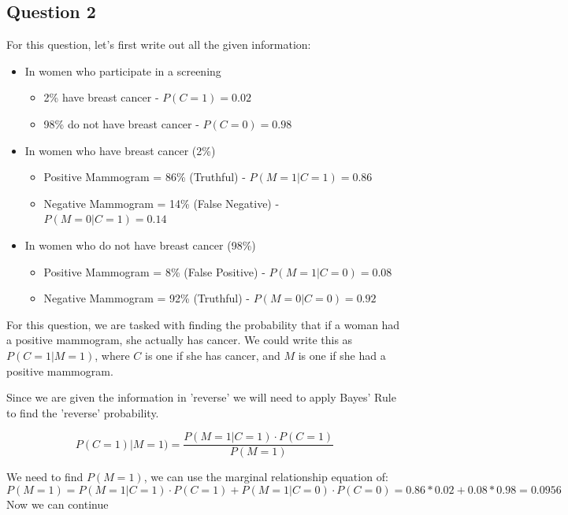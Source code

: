 \documentclass[conf]{new-aiaa}
\begin{document}
\subsection{Question 2}

For this question, let's first write out all the given information:

\begin{itemize}
    \item In women who participate in a screening
    \begin{itemize}
        \item 2\% have breast cancer - $P(C = 1) = 0.02$
        \item 98\% do not have breast cancer - $P(C = 0) = 0.98$
    \end{itemize}

    \item In women who have breast cancer (2\%)
    \begin{itemize}
        \item Positive Mammogram = 86\% (Truthful) - $P(M = 1|C = 1) = 0.86$
        \item Negative Mammogram = 14\% (False Negative) - $P(M = 0|C = 1) = 0.14$
    \end{itemize}

    \item In women who do not have breast cancer (98\%)
    \begin{itemize}
        \item Positive Mammogram = 8\% (False Positive) - $P(M = 1|C = 0) = 0.08$
        \item Negative Mammogram = 92\% (Truthful) - $P(M = 0|C = 0) = 0.92$
    \end{itemize}
\end{itemize}

For this question, we are tasked with finding the probability that if a woman had a positive mammogram, she actually has cancer. We could write this as
$P(C = 1|M = 1)$, where $C$ is one if she has cancer, and $M$ is one if she had a positive mammogram. 

Since we are given the information in 'reverse' we will need to apply Bayes' Rule to find the 'reverse' probability. 

\[P(C = 1)|M = 1) = \frac{P(M = 1|C = 1) \cdot P(C = 1)}{P(M = 1)}\]

We need to find $P(M = 1)$, we can use the marginal relationship equation of: \[P(M = 1) = P(M = 1|C = 1)\cdot P(C=1) + P(M = 1|C = 0)\cdot P(C=0) = 0.86 * 0.02 + 0.08 * 0.98 = 0.0956\]
Now we can continue
\end{document}
